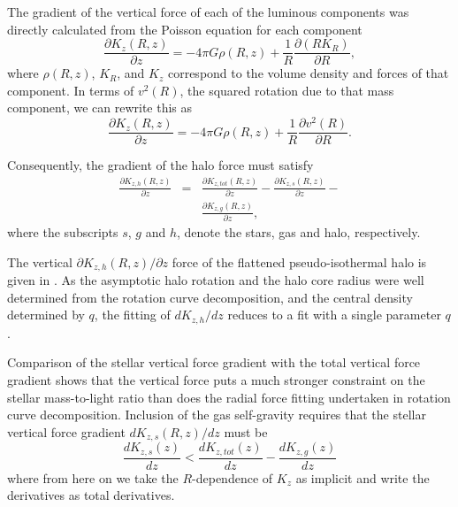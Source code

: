 \documentclass[traditabstract]{aa} %
\begin{document}
The gradient of the vertical force of each of the luminous components
was directly calculated from the Poisson equation for each component
\begin{equation}
\label{eq:ch7-poisson-1}
\frac{\partial K_z(R,z)}{\partial z} =
 - 4\pi G \rho(R,z) + \frac{1}{R}\frac{\partial (R K_R)}{\partial R},
\end{equation}
where $\rho(R,z)$, $K_R$, and $K_z$ correspond to the volume density 
and forces of that component.
In terms of $v^2(R)$, the squared rotation due to that mass component,
we can rewrite this as
\begin{equation}
\label{eq:ch7-poisson-2}
\frac{\partial K_z(R,z)}{\partial z} =
 -4\pi G \rho(R,z) + \frac{1}{R} \frac{\partial v^2(R)}{\partial R}.
\end{equation}

Consequently, the gradient of the halo force must satisfy
\begin{eqnarray}
\frac{\partial K_{z,h}(R,z)}{\partial z} &=& \frac{\partial
  K_{z,tot}(R,z)}{\partial z} - \frac{\partial
  K_{z,s}(R,z)}{\partial z} - \nonumber \\
 && \frac{\partial K_{z,g}(R,z)}{\partial z},
\end{eqnarray}
where the subscripts $s$, $g$ and $h$, denote the stars, gas and halo,
respectively. 


The vertical $\partial K_{z,h}(R,z)/\partial z$ force of the flattened
pseudo-isothermal halo is given in \citet{srjf1994}. As
the asymptotic halo rotation and the halo core radius were well
determined from the rotation curve decomposition, and the central
density determined by $q$, the fitting of $dK_{z,h}/dz$ reduces to a
fit with a single parameter $q$. 

Comparison of the stellar vertical force gradient with the total
vertical force gradient shows that the vertical force puts a much
stronger constraint on the stellar mass-to-light ratio than does the
radial force fitting undertaken in rotation curve decomposition.
Inclusion of the gas self-gravity requires that the stellar vertical
force gradient $dK_{z,s}(R,z)/dz$ must be
\begin{equation}
\frac{d K_{z,s}(z)}{dz} < \frac{d K_{z,tot}(z)}{dz} - \frac{d
  K_{z,g}(z)}{dz}
\end{equation}
where from here on we take the $R$-dependence of $K_z$ as implicit and
write the derivatives as total derivatives. 
\end{document}
